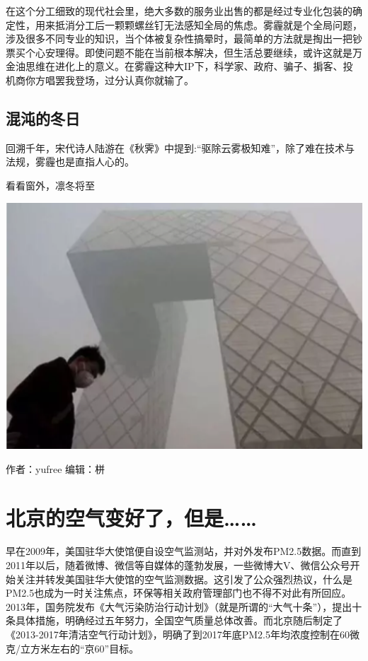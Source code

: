 \documentclass[]{book}
\begin{document}
在这个分工细致的现代社会里，绝大多数的服务业出售的都是经过专业化包装的确定性，用来抵消分工后一颗颗螺丝钉无法感知全局的焦虑。雾霾就是个全局问题，涉及很多不同专业的知识，当个体被复杂性搞晕时，最简单的方法就是掏出一把钞票买个心安理得。即使问题不能在当前根本解决，但生活总要继续，或许这就是万金油思维在进化上的意义。在雾霾这种大IP下，科学家、政府、骗子、掮客、投机商你方唱罢我登场，过分认真你就输了。

\subsection{混沌的冬日}\label{-1}

回溯千年，宋代诗人陆游在《秋霁》中提到:``驱除云雾极知难''，除了难在技术与法规，雾霾也是直指人心的。

看看窗外，凛冬将至

\includegraphics[width=6.67in]{images/cw5}

作者：yufree 编辑：栟

\section{北京的空气变好了，但是\ldots{}\ldots{}}

早在2009年，美国驻华大使馆便自设空气监测站，并对外发布PM2.5数据。而直到2011年以后，随着微博、微信等自媒体的蓬勃发展，一些微博大V、微信公众号开始关注并转发美国驻华大使馆的空气监测数据。这引发了公众强烈热议，什么是PM2.5也成为一时关注焦点，环保等相关政府管理部门也不得不对此有所回应。2013年，国务院发布《大气污染防治行动计划》（就是所谓的``大气十条''），提出十条具体措施，明确经过五年努力，全国空气质量总体改善。而北京随后制定了《2013-2017年清洁空气行动计划》，明确了到2017年底PM2.5年均浓度控制在60微克/立方米左右的``京60''目标。
\end{document}

